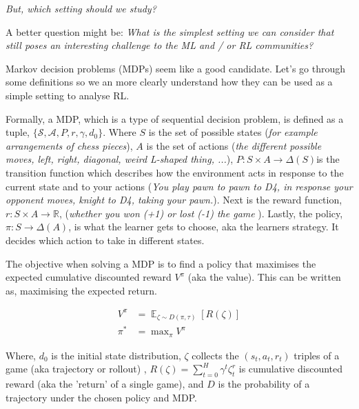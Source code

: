 \begin{displayquote}
  \textit{But, which setting should we study?}
\end{displayquote}

\begin{displayquote}
  A better question might be: \textit{What is the simplest setting we can
  consider that still poses an interesting challenge to the ML and / or RL communities?}
\end{displayquote}

Markov decision problems (MDPs) seem like a good candidate. Let's go through some definitions so we an more clearly understand how they can be used as a
simple setting to analyse RL.

Formally, a MDP, which is a type of sequential decision problem, is defined
as a tuple, $\{\mathcal S, \mathcal A, P,r, \gamma, d_0\}$.
Where $S$ is the set of possible states (\textit{for example arrangements of chess pieces}),
$A$ is the set of actions (\textit{the different possible moves, left,
right, diagonal, weird L-shaped thing, ...}),  $P: S \times A \to \Delta(S)$\footnotemark[16]
is the transition function which describes how the environment acts in response
to the current state and to your actions (\textit{You play pawn to pawn to D4, in response your
opponent moves, knight to D4, taking your pawn.}). Next is the reward function, $r: S\times A \to \mathbb R$,
(\textit{whether you won (+1) or lost (-1) the game }).
Lastly, the policy, $\pi: S \to \Delta(A)$, is what the learner gets to choose, aka the learners strategy.
It decides which action to take in different states.


\vspace{5mm}

The objective when solving a MDP is to find a policy
that maximises the expected cumulative discounted reward $V^{\pi}$ (aka the value). This
can be written as, maximising the expected return.

\begin{align*}
V^{\pi} &= \mathop{\mathbb E}_{\zeta \sim D(\pi, \tau)} [R(\zeta)] \\
\pi^{* } &= \mathop{\text{max}}_{\pi}V^{\pi}
\end{align*}


Where, $d_0$ is the initial state distribution, $\zeta$ collects the $(s_t, a_t, r_t)$ triples of a game (aka trajectory or rollout) \footnotemark[17],
$R(\zeta) =\sum_{t=0}^H \gamma^t \zeta^r_t$ is cumulative discounted reward (aka the 'return' of a single game), and $D$ is the probability of a trajectory under the chosen policy and MDP.

